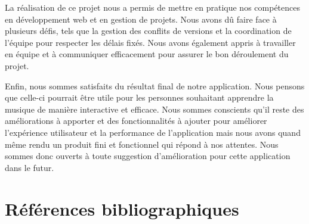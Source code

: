 \documentclass[12pt,french]{article}
\begin{document}
\medskip

La réalisation de ce projet nous a permis de mettre en pratique nos compétences en développement web et en gestion de projets. Nous avons dû faire face à plusieurs défis, tels que la gestion des conflits de versions et la coordination de l'équipe pour respecter les délais fixés. Nous avons également appris à travailler en équipe et à communiquer efficacement pour assurer le bon déroulement du projet.

\medskip

Enfin, nous sommes satisfaits du résultat final de notre application. Nous pensons que celle-ci pourrait être utile pour les personnes souhaitant apprendre la musique de manière interactive et efficace. Nous sommes conscients qu'il reste des améliorations à apporter et des fonctionnalités à ajouter pour améliorer l'expérience utilisateur et la performance de l'application mais nous avons quand même rendu un produit fini et fonctionnel qui répond à nos attentes. Nous sommes donc ouverts à toute suggestion d'amélioration pour cette application dans le futur.

\newpage
\vspace*{5pt}

\section*{Références bibliographiques}
\end{document}
